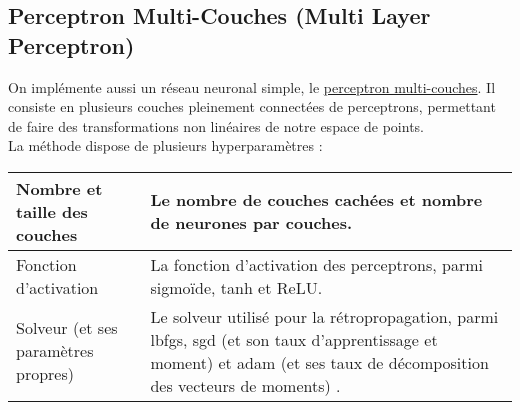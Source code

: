 \subsection{Perceptron Multi-Couches (Multi Layer Perceptron)}

On implémente aussi un réseau neuronal simple, le \href{https://scikit-learn.org/stable/modules/generated/sklearn.neural_network.MLPClassifier.html}{perceptron multi-couches}. Il consiste en plusieurs couches pleinement connectées de perceptrons, permettant de faire des transformations non linéaires de notre espace de points.\\

La méthode dispose de plusieurs hyperparamètres :

\noindent
\begin{tabularx}{\textwidth}{|X|X|}
    \hline
    Nombre et taille des couches  & Le nombre de couches cachées et nombre de neurones par couches.\\\hline
    Fonction d'activation & La fonction d'activation des perceptrons, parmi sigmoïde, tanh et ReLU. \\\hline
    Solveur (et ses paramètres propres) & Le solveur utilisé pour la rétropropagation, parmi lbfgs, sgd (et son taux d'apprentissage et moment) et adam (et ses taux de décomposition des vecteurs de moments) . \\\hline
\end{tabularx}